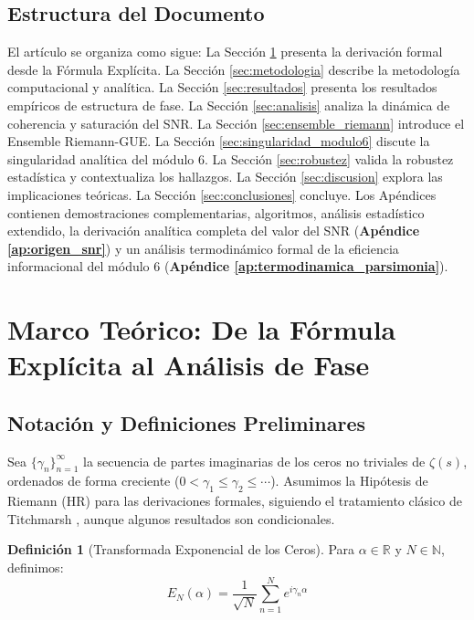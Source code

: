 \documentclass[12pt, a4paper]{article}
\theoremstyle{plain}
\theoremstyle{definition}
\newtheorem{definicion}[teorema]{Definición}
\theoremstyle{remark}
\begin{document}
\subsection{Estructura del Documento}
\label{subsec:estructura}

El artículo se organiza como sigue: La Sección \ref{sec:marco_teorico} presenta la derivación formal desde la Fórmula Explícita. La Sección \ref{sec:metodologia} describe la metodología computacional y analítica. La Sección \ref{sec:resultados} presenta los resultados empíricos de estructura de fase. La Sección \ref{sec:analisis} analiza la dinámica de coherencia y saturación del SNR. La Sección \ref{sec:ensemble_riemann} introduce el Ensemble Riemann-GUE. La Sección \ref{sec:singularidad_modulo6} discute la singularidad analítica del módulo 6. La Sección \ref{sec:robustez} valida la robustez estadística y contextualiza los hallazgos. La Sección \ref{sec:discusion} explora las implicaciones teóricas. La Sección \ref{sec:conclusiones} concluye. Los Apéndices contienen demostraciones complementarias, algoritmos, análisis estadístico extendido, la derivación analítica completa del valor del SNR (\textbf{Apéndice \ref{ap:origen_snr}}) y un análisis termodinámico formal de la eficiencia informacional del módulo 6 (\textbf{Apéndice \ref{ap:termodinamica_parsimonia}}).

\section{Marco Teórico: De la Fórmula Explícita al Análisis de Fase}
\label{sec:marco_teorico}

\subsection{Notación y Definiciones Preliminares}
\label{subsec:notacion}

Sea $\{\gamma_n\}_{n=1}^\infty$ la secuencia de partes imaginarias de los ceros no triviales de $\zeta(s)$, ordenados de forma creciente ($0 < \gamma_1 \leq \gamma_2 \leq \cdots$). Asumimos la Hipótesis de Riemann (HR) para las derivaciones formales, siguiendo el tratamiento clásico de Titchmarsh \cite{titchmarsh1986}, aunque algunos resultados son condicionales.

\begin{definicion}[Transformada Exponencial de los Ceros]
Para $\alpha \in \mathbb{R}$ y $N \in \mathbb{N}$, definimos:
\[
E_N(\alpha) = \frac{1}{\sqrt{N}} \sum_{n=1}^N e^{i\gamma_n \alpha}
\]
\end{definicion}
\end{document}
